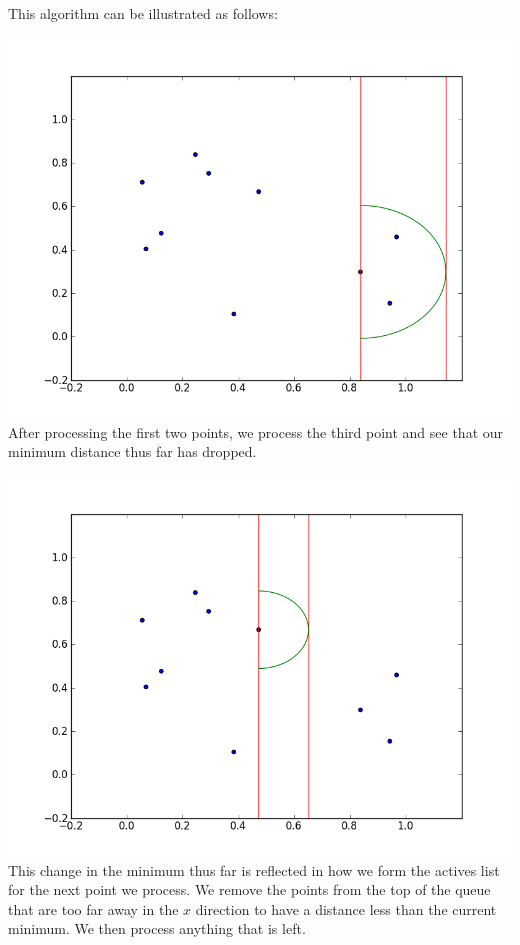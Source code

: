 This algorithm can be illustrated as follows:

\includegraphics[width = \textwidth]{simple1.png}
After processing the first two points, we process the third point and see that our minimum distance thus far has dropped.

\includegraphics[width = \textwidth]{simple2.png}
This change in the minimum thus far is reflected in how we form the actives list for the next point we process. We remove the points from the top of the queue that are too far away in the $x$ direction to have a distance less than the current minimum. We then process anything that is left.

